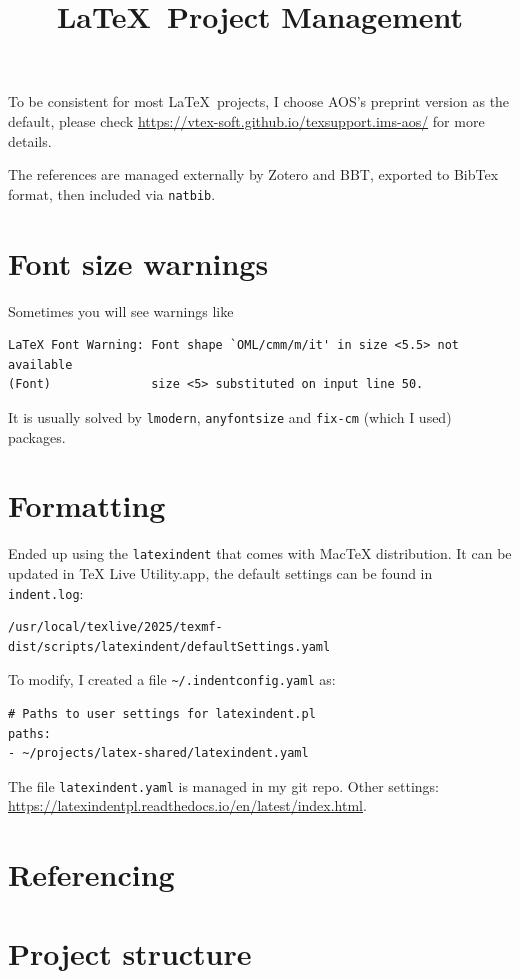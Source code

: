 \documentclass[aos,preprint]{imsart}
\begin{document}
\title{\LaTeX\ Project Management}

To be consistent for most \LaTeX\ projects,
I choose AOS's preprint version as the default, please check
\url{https://vtex-soft.github.io/texsupport.ims-aos/} for more details.

The references are managed externally by Zotero and BBT,
exported to BibTex format, then included via \verb|natbib|.

\section{Font size warnings}

Sometimes you will see warnings like
\begin{Verbatim}
LaTeX Font Warning: Font shape `OML/cmm/m/it' in size <5.5> not available
(Font)              size <5> substituted on input line 50.
\end{Verbatim}

It is usually solved by \verb|lmodern|, \verb|anyfontsize| and \verb|fix-cm| (which I used) packages.

\section{Formatting}

Ended up using the \verb|latexindent| that comes with MacTeX distribution.
It can be updated in TeX Live Utility.app, the default settings can be found in \verb|indent.log|:
\begin{Verbatim}
/usr/local/texlive/2025/texmf-dist/scripts/latexindent/defaultSettings.yaml
\end{Verbatim}

To modify, I created a file \verb|~/.indentconfig.yaml| as:
\begin{Verbatim}
# Paths to user settings for latexindent.pl
paths:
- ~/projects/latex-shared/latexindent.yaml
\end{Verbatim}

The file \verb|latexindent.yaml| is managed in my git repo.
Other settings: \url{https://latexindentpl.readthedocs.io/en/latest/index.html}.

\section{Referencing}


\section{Project structure}
\end{document}
